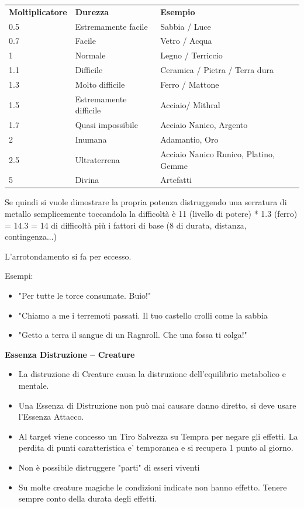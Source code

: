 \documentclass[a4paper,11pt,twoside,openany]{book}
\begin{document}
\medskip
\begin{tabular}{lll}
	\toprule
	\textbf{Moltiplicatore} & \textbf{Durezza}       & \textbf{Esempio}\\
	0.5                   & Estremamente facile    & Sabbia / Luce \\
0.7                   & Facile                 & Vetro / Acqua\\
1                     & Normale                & Legno / Terriccio\\
1.1                   & Difficile              & Ceramica / Pietra / Terra dura\\
1.3                   & Molto difficile        & Ferro / Mattone\\
1.5                   & Estremamente difficile & Acciaio/ Mithral\\
1.7                   & Quasi impossibile      & Acciaio Nanico, Argento\\
2                     & Inumana                & Adamantio, Oro\\
2.5                   & Ultraterrena           & Acciaio Nanico Runico, Platino, Gemme\\
5                     & Divina                 & Artefatti \\

\end{tabular}

\bigskip

Se quindi si vuole dimostrare la propria potenza distruggendo una serratura di metallo semplicemente toccandola la difficoltà è 11 (livello di potere) {*} 1.3 (ferro) = 14.3 = 14 di difficoltà più i fattori di base (8 di durata, distanza, contingenza...)

L'arrotondamento si fa per eccesso.

Esempi:
\begin{itemize}
	\item
	      "Per tutte le torce consumate. Buio!"
	\item
	      "Chiamo a me i terremoti passati. Il tuo castello crolli come la sabbia
	\item
	      "Getto a terra il sangue di un Ragnroll. Che una fossa ti colga!"
\end{itemize}


\textbf{Essenza Distruzione -- Creature}
\begin{itemize}
	\item
	      La distruzione di Creature causa la distruzione dell'equilibrio metabolico e mentale.
	\item
	      Una Essenza di Distruzione non può mai causare danno diretto, si deve usare l'Essenza Attacco.
	\item
	      Al target viene concesso un Tiro Salvezza su Tempra per negare gli effetti. La perdita di punti caratteristica e' temporanea e si recupera 1 punto al giorno.
	\item
	      Non è possibile distruggere "parti" di esseri viventi
	\item
	      Su molte creature magiche le condizioni indicate non hanno effetto. Tenere sempre conto della durata degli effetti.
\end{itemize}
\end{document}
